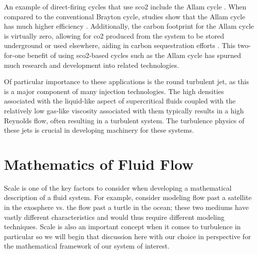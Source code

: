 An example of direct-firing cycles that use \gls{sco2} include the Allam cycle \cite{allam2013system}. When compared to the conventional Brayton cycle, studies show that the Allam cycle has much higher efficiency \cite{ALLAMCOMP, ALLAM20175948}. Additionally, the carbon footprint for the Allam cycle is virtually zero, allowing for \gls{co2} produced from the system to be stored underground or used elsewhere, aiding in carbon sequestration efforts \cite{cleantechnol1010022}. This two-for-one benefit of using \gls{sco2}-based cycles such as the Allam cycle has spurned much research \cite{ALLAMTech1, CHAN2021113972} and development \cite{8Rivers} into related technologies.

Of particular importance to these applications is the round turbulent jet, as this is a major component of many injection technologies. The high densities associated with the liquid-like aspect of supercritical fluids coupled with the relatively low gas-like viscosity associated with them typically results in a high Reynolds flow, often resulting in a turbulent system. The turbulence physics of these jets is crucial in developing machinery for these systems. 

\section{Mathematics of Fluid Flow}

Scale is one of the key factors to consider when developing a mathematical description of a fluid system. For example, consider modeling flow past a satellite in the exosphere vs. the flow past a turtle in the ocean; these two mediums have vastly different characteristics and would thus require different modeling techniques. Scale is also an important concept when it comes to turbulence in particular so we will begin that discussion here with our choice in perspective for the mathematical framework of our system of interest.

